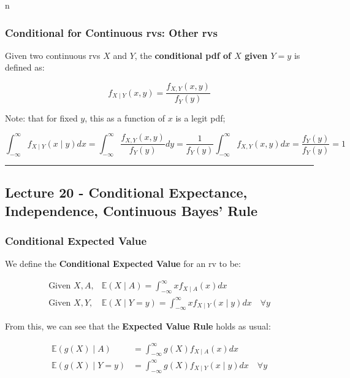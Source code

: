 n\documentclass{article}
\begin{document}
\subsubsection{Conditional for Continuous rvs: Other rvs}

Given two continuous rvs $X$ and $Y$, the \textbf{conditional pdf of
  $X$ given $Y = y$} is defined as:

\begin{equation}
  \tag{Conditional pdf: Other rvs}
  \boxed{
    f_{X\mid Y}(x,y) = \frac{f_{X,Y}(x,y)}{f_Y(y)}
  }
\end{equation}

Note: that for fixed $y$, this as a function of $x$ is a legit pdf;

\[
  \int_{-\infty}^\infty f_{X\mid Y}(x\mid y) dx =
  \int_{-\infty}^\infty \frac{f_{X,Y}(x,y)}{f_{Y}(y)} dy =
  \frac{1}{f_Y(y)} \int_{-\infty}^{\infty} f_{X,Y}(x,y)dx =
  \frac{f_Y(y)}{f_Y(y)} = 1
\]


\medskip\hrule
\subsection{Lecture 20 - Conditional Expectance, Independence,
  Continuous Bayes' Rule}

\subsubsection{Conditional Expected Value}

We define the \textbf{Conditional Expected Value} for an rv to be:

\begin{equation}
  \tag{}
  \boxed{
    \begin{aligned}
      \text{Given } X, A,
      & \mathbb{E}(X\mid A) = \int_{-\infty}^\infty xf_{X\mid A}(x) dx
      \\
      \text{Given } X, Y,
      & \mathbb{E}(X\mid Y=y) = \int _{-\infty}^\infty xf_{X\mid
        Y}(x\mid y) dx \quad \forall y
    \end{aligned}
  }
\end{equation}

From this, we can see that the \textbf{Expected Value Rule} holds as
usual:

\begin{equation}
  \tag{Conditional Expected Value Rule}
  \boxed{
    \begin{aligned}
      \mathbb{E}(g(X)\mid A)
      &= \int_{-\infty}^\infty g(X) f_{X\mid A}(x)dx \\
      \mathbb{E}(g(X)\mid Y=y)
      &= \int_{-\infty}^\infty g(X) f_{X\mid Y}(x\mid y) dx \quad
      \forall y
    \end{aligned}
  }
\end{equation}
\end{document}
